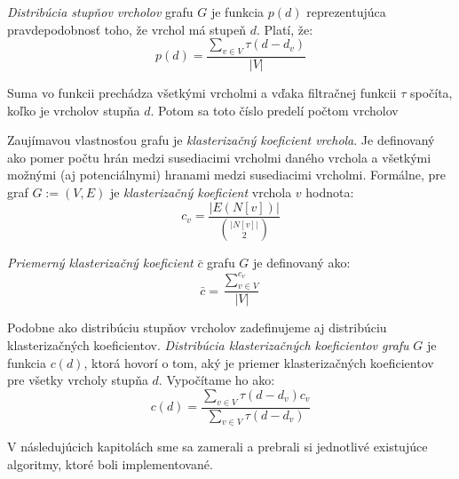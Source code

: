 \emph{Distribúcia stupňov vrcholov} grafu $G$ je funkcia 
$p(d)$ reprezentujúca pravdepodobnosť toho, že vrchol má stupeň $d$. Platí, že: 
$$p(d) = \frac{\sum_{v \in V}^{}{\tau(d - d_v)}}{|V|}$$

Suma vo funkcii prechádza všetkými vrcholmi a vďaka filtračnej funkcii $\tau$ 
spočíta, koľko je vrcholov stupňa $d$. Potom sa toto číslo predelí počtom vrcholov

Zaujímavou vlastnosťou grafu je \emph{klasterizačný koeficient vrchola}. Je 
definovaný ako pomer počtu hrán medzi susediacimi vrcholmi daného vrchola a 
všetkými možnými (aj potenciálnymi) hranami medzi susediacimi vrcholmi. 
Formálne, pre graf $G := (V, E)$ je \emph{klasterizačný koeficient} vrchola 
$v$ hodnota: $$c_v = \frac{|E(N[v])|}{\binom{|N[v]|}{2}}$$

\emph{Priemerný klasterizačný koeficient} $\bar{c}$ grafu $G$ je definovaný ako:
$$\bar{c} = \frac{\sum_{v\in V}^{c_v}}{|V|}$$

Podobne ako distribúciu stupňov vrcholov zadefinujeme aj distribúciu 
klasterizačných koeficientov. \emph{Distribúcia klasterizačných koeficientov 
grafu} $G$ je funkcia $c(d)$, ktorá hovorí o tom, aký je priemer
klasterizačných koeficientov pre všetky vrcholy stupňa $d$. Vypočítame ho ako: 
$$c(d) = \frac{\sum_{v \in V}^{}{\tau(d - d_v)c_v}}
{\sum_{v \in V}^{}{\tau(d - d_v)}}$$


V následujúcich kapitolách sme sa zamerali a prebrali si jednotlivé existujúce 
algoritmy, ktoré boli implementované.

